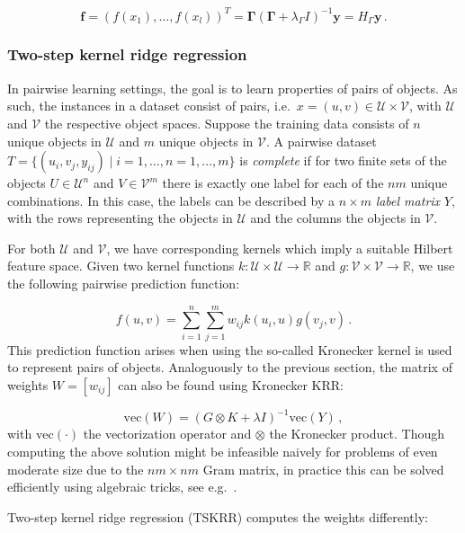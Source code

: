 \documentclass[
]{article}
\begin{document}
\[
\mathbf{f} =(f(x_1),\ldots, f(x_l))^T =\mathbf{\Gamma}(\mathbf{\Gamma}+\lambda_\Gamma I)^{-1}\mathbf{y}= H_\Gamma\mathbf{y}\,.
\]

\hypertarget{two-step-kernel-ridge-regression}{%
\subsubsection{Two-step kernel ridge
regression}\label{two-step-kernel-ridge-regression}}

In pairwise learning settings, the goal is to learn properties of pairs
of objects. As such, the instances in a dataset consist of pairs,
i.e.~\(x=(u, v) \in\mathcal{U}\times\mathcal{V}\), with \(\mathcal{U}\)
and \(\mathcal{V}\) the respective object spaces. Suppose the training
data consists of \(n\) unique objects in \(\mathcal{U}\) and \(m\)
unique objects in \(\mathcal{V}\). A pairwise dataset
\(T=\{(u_i, v_j, y_{ij}) \mid i=1,\ldots,n=1,\ldots,m\}\) is
\emph{complete} if for two finite sets of the objects
\(U\in \mathcal{U}^n\) and \(V\in \mathcal{V}^m\) there is exactly one
label for each of the \(nm\) unique combinations. In this case, the
labels can be described by a \(n\times m\) \emph{label matrix} \(Y\),
with the rows representing the objects in \(\mathcal{U}\) and the
columns the objects in \(\mathcal{V}\).

For both \(\mathcal{U}\) and \(\mathcal{V}\), we have corresponding
kernels which imply a suitable Hilbert feature space. Given two kernel
functions \(k: \mathcal{U} \times \mathcal{U} \rightarrow \mathbb{R}\)
and \(g: \mathcal{V} \times \mathcal{V} \rightarrow \mathbb{R}\), we use
the following pairwise prediction function:

\[
f(u, v) = \sum_{i=1}^n\sum_{j=1}^m w_{ij} k(u_i,u)g(v_j, v) \,.
\] This prediction function arises when using the so-called Kronecker
kernel is used to represent pairs of objects. Analoguously to the
previous section, the matrix of weights \(W=[w_{ij}]\) can also be found
using Kronecker KRR:

\[
\text{vec}(W) =(G\otimes K + \lambda I)^{-1} \text{vec}(Y)\,,
\] with \(\text{vec}(\cdot)\) the vectorization operator and \(\otimes\)
the Kronecker product. Though computing the above solution might be
infeasible naively for problems of even moderate size due to the
\(nm\times nm\) Gram matrix, in practice this can be solved efficiently
using algebraic tricks, see e.g.~\citet{pahikkala2013conditional}.

Two-step kernel ridge regression (TSKRR) computes the weights
differently:
\end{document}
